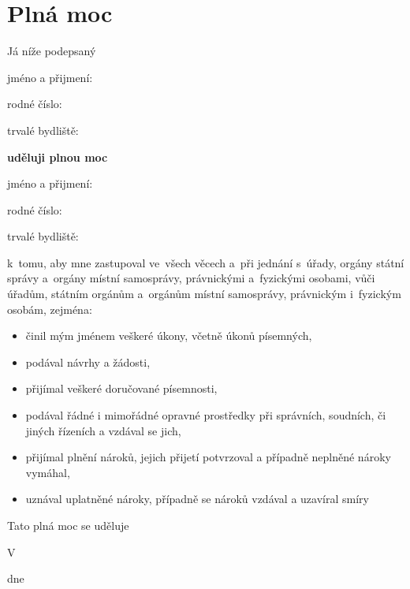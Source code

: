 \documentclass{article}
\newcommand\HandwrittenText[1]{%
  \parbox[t]{#1}{%
    \centering
    \dotfill\par
    \nointerlineskip\vspace{2pt}
  }%
}
\begin{document}

\section*{\centering Plná moc}
Já níže podepsaný \par
jméno a přijmení:\HandwrittenText{5cm}{} \par
 rodné číslo:\HandwrittenText{6cm}{} \par
 trvalé bydliště:\HandwrittenText{5.43cm}{} \par
 \HandwrittenText{7.75cm}{} \par
\begin{center}
  \textbf{uděluji plnou moc}
\end{center}
 jméno a přijmení:\HandwrittenText{5cm}{} \par
 rodné číslo:\HandwrittenText{6cm}{} \par
 trvalé bydliště:\HandwrittenText{5.43cm}{} \par
 \HandwrittenText{7.75cm}{} \par
 \vskip 0.5cm
k~tomu, aby mne zastupoval ve~všech věcech a~při jednání s~úřady, orgány státní správy a~orgány místní samosprávy, právnickými a~fyzickými osobami, vůči úřadům, státním orgánům a~orgánům místní samosprávy, právnickým i~fyzickým osobám, zejména:

\begin{itemize}
    \setlength\itemsep{-0.15cm}
  \item činil mým jménem veškeré úkony, včetně úkonů písemných,
  \item podával návrhy a žádosti,
  \item přijímal veškeré doručované písemnosti,
  \item podával řádné i mimořádné opravné prostředky při správních, soudních, či jiných řízeních a vzdával se jich,
  \item přijímal plnění nároků, jejich přijetí potvrzoval a případně neplněné nároky vymáhal,
  \item uznával uplatněné nároky, případně se nároků vzdával a uzavíral smíry
\end{itemize}

\vskip 2cm
Tato plná moc se uděluje \HandwrittenText{5cm}
\vskip 0.5cm
V \HandwrittenText{3cm} dne \HandwrittenText{3cm} \\
\vskip 0.5cm
\HandwrittenText{7.2cm}
\end{document}

